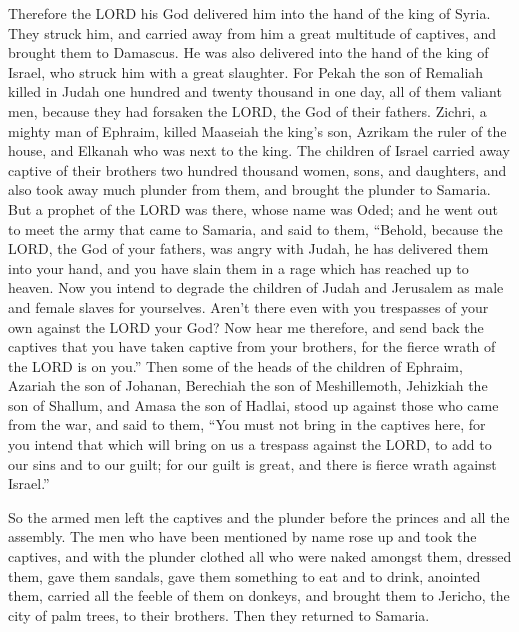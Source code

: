  Therefore the LORD his God delivered him into the hand of
the king of Syria. They struck him, and carried away from him a great
multitude of captives, and brought them to Damascus. He was also
delivered into the hand of the king of Israel, who struck him with a
great slaughter.  For Pekah the son of Remaliah killed in
Judah one hundred and twenty thousand in one day, all of them valiant
men, because they had forsaken the LORD, the God of their fathers.
 Zichri, a mighty man of Ephraim, killed Maaseiah the
king's son, Azrikam the ruler of the house, and Elkanah who was next to
the king.  The children of Israel carried away captive of
their brothers two hundred thousand women, sons, and daughters, and also
took away much plunder from them, and brought the plunder to Samaria.
 But a prophet of the LORD was there, whose name was Oded;
and he went out to meet the army that came to Samaria, and said to them,
``Behold, because the LORD, the God of your fathers, was angry with
Judah, he has delivered them into your hand, and you have slain them in
a rage which has reached up to heaven.  Now you intend to
degrade the children of Judah and Jerusalem as male and female slaves
for yourselves. Aren't there even with you trespasses of your own
against the LORD your God?  Now hear me therefore, and
send back the captives that you have taken captive from your brothers,
for the fierce wrath of the LORD is on you.''  Then some
of the heads of the children of Ephraim, Azariah the son of Johanan,
Berechiah the son of Meshillemoth, Jehizkiah the son of Shallum, and
Amasa the son of Hadlai, stood up against those who came from the war,
 and said to them, ``You must not bring in the captives
here, for you intend that which will bring on us a trespass against the
LORD, to add to our sins and to our guilt; for our guilt is great, and
there is fierce wrath against Israel.''

 So the armed men left the captives and the plunder
before the princes and all the assembly.  The men who
have been mentioned by name rose up and took the captives, and with the
plunder clothed all who were naked amongst them, dressed them, gave them
sandals, gave them something to eat and to drink, anointed them, carried
all the feeble of them on donkeys, and brought them to Jericho, the city
of palm trees, to their brothers. Then they returned to Samaria.

